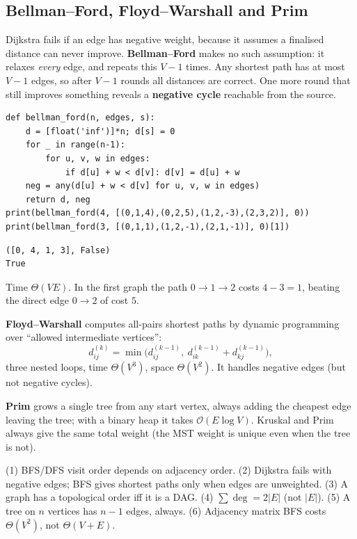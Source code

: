 \documentclass[11pt,a4paper]{article}
\newcommand{\Oh}{\mathcal{O}}
\begin{document}
\subsection{Bellman--Ford, Floyd--Warshall and Prim}
\begin{story}
Dijkstra fails if an edge has negative weight, because it assumes a finalised distance can never improve. \textbf{Bellman--Ford} makes no such assumption: it relaxes \emph{every} edge, and repeats this $V-1$ times. Any shortest path has at most $V-1$ edges, so after $V-1$ rounds all distances are correct. One more round that still improves something reveals a \textbf{negative cycle} reachable from the source.
\end{story}
\begin{lstlisting}
def bellman_ford(n, edges, s):
    d = [float('inf')]*n; d[s] = 0
    for _ in range(n-1):
        for u, v, w in edges:
            if d[u] + w < d[v]: d[v] = d[u] + w
    neg = any(d[u] + w < d[v] for u, v, w in edges)
    return d, neg
print(bellman_ford(4, [(0,1,4),(0,2,5),(1,2,-3),(2,3,2)], 0))
print(bellman_ford(3, [(0,1,1),(1,2,-1),(2,1,-1)], 0)[1])
\end{lstlisting}
\begin{lstlisting}[style=out]
([0, 4, 1, 3], False)
True
\end{lstlisting}
Time $\Theta(VE)$. In the first graph the path $0\to1\to2$ costs $4-3=1$, beating the direct edge $0\to2$ of cost $5$.

\textbf{Floyd--Warshall} computes all-pairs shortest paths by dynamic programming over ``allowed intermediate vertices'':
\[d^{(k)}_{ij}=\min\bigl(d^{(k-1)}_{ij},\ d^{(k-1)}_{ik}+d^{(k-1)}_{kj}\bigr),\]
three nested loops, time $\Theta(V^3)$, space $\Theta(V^2)$. It handles negative edges (but not negative cycles).

\textbf{Prim} grows a single tree from any start vertex, always adding the cheapest edge leaving the tree; with a binary heap it takes $\Oh(E\log V)$. Kruskal and Prim always give the same total weight (the MST weight is unique even when the tree is not).

\begin{trap}
(1) BFS/DFS visit order depends on adjacency order. (2) Dijkstra fails with negative edges; BFS gives shortest paths only when edges are unweighted. (3) A graph has a topological order iff it is a DAG. (4) $\sum\deg=2|E|$ (not $|E|$). (5) A tree on $n$ vertices has $n-1$ edges, always. (6) Adjacency matrix BFS costs $\Theta(V^2)$, not $\Theta(V+E)$.
\end{trap}
\end{document}
